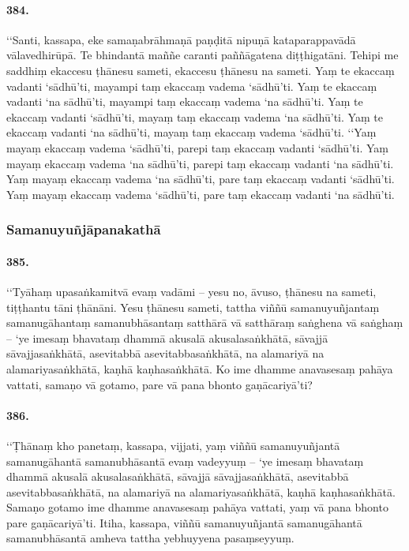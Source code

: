 \paragraph{384.} ‘‘Santi, kassapa, eke samaṇabrāhmaṇā paṇḍitā nipuṇā kataparappavādā vālavedhirūpā. Te bhindantā maññe caranti paññāgatena diṭṭhigatāni. Tehipi me saddhiṃ ekaccesu ṭhānesu sameti, ekaccesu ṭhānesu na sameti. Yaṃ te ekaccaṃ vadanti ‘sādhū’ti, mayampi taṃ ekaccaṃ vadema ‘sādhū’ti. Yaṃ te ekaccaṃ vadanti ‘na sādhū’ti, mayampi taṃ ekaccaṃ vadema ‘na sādhū’ti. Yaṃ te ekaccaṃ vadanti ‘sādhū’ti, mayaṃ taṃ ekaccaṃ vadema ‘na sādhū’ti. Yaṃ te ekaccaṃ vadanti ‘na sādhū’ti, mayaṃ taṃ ekaccaṃ vadema ‘sādhū’ti. ‘‘Yaṃ mayaṃ ekaccaṃ vadema ‘sādhū’ti, parepi taṃ ekaccaṃ vadanti ‘sādhū’ti. Yaṃ mayaṃ ekaccaṃ vadema ‘na sādhū’ti, parepi taṃ ekaccaṃ vadanti ‘na sādhū’ti. Yaṃ mayaṃ ekaccaṃ vadema ‘na sādhū’ti, pare taṃ ekaccaṃ vadanti ‘sādhū’ti. Yaṃ mayaṃ ekaccaṃ vadema ‘sādhū’ti, pare taṃ ekaccaṃ vadanti ‘na sādhū’ti.

\subsubsection{Samanuyuñjāpanakathā}

\paragraph{385.} ‘‘Tyāhaṃ upasaṅkamitvā evaṃ vadāmi – yesu no, āvuso, ṭhānesu na sameti, tiṭṭhantu tāni ṭhānāni. Yesu ṭhānesu sameti, tattha viññū samanuyuñjantaṃ samanugāhantaṃ samanubhāsantaṃ satthārā vā satthāraṃ saṅghena vā saṅghaṃ – ‘ye imesaṃ bhavataṃ dhammā akusalā akusalasaṅkhātā, sāvajjā sāvajjasaṅkhātā, asevitabbā asevitabbasaṅkhātā, na alamariyā na alamariyasaṅkhātā, kaṇhā kaṇhasaṅkhātā. Ko ime dhamme anavasesaṃ pahāya vattati, samaṇo vā gotamo, pare vā pana bhonto gaṇācariyā’ti?

\paragraph{386.} ‘‘Ṭhānaṃ kho panetaṃ, kassapa, vijjati, yaṃ viññū samanuyuñjantā samanugāhantā samanubhāsantā evaṃ vadeyyuṃ – ‘ye imesaṃ bhavataṃ dhammā akusalā akusalasaṅkhātā, sāvajjā sāvajjasaṅkhātā, asevitabbā asevitabbasaṅkhātā, na alamariyā na alamariyasaṅkhātā, kaṇhā kaṇhasaṅkhātā. Samaṇo gotamo ime dhamme anavasesaṃ pahāya vattati, yaṃ vā pana bhonto pare gaṇācariyā’ti. Itiha, kassapa, viññū samanuyuñjantā samanugāhantā samanubhāsantā amheva tattha yebhuyyena pasaṃseyyuṃ.

